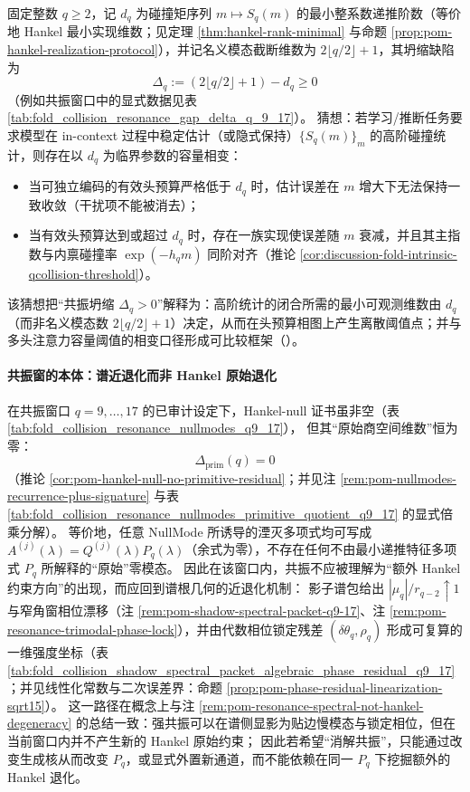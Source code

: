 \begin{conjecture}\label{conj:discussion-hankel-collapse-head-budget-phase-transition}
固定整数 \(q\ge 2\)，记 \(d_q\) 为碰撞矩序列 \(m\mapsto S_q(m)\) 的最小整系数递推阶数（等价地 Hankel 最小实现维数；见定理 \ref{thm:hankel-rank-minimal} 与命题 \ref{prop:pom-hankel-realization-protocol}），并记名义模态截断维数为 \(2\lfloor q/2\rfloor+1\)，其坍缩缺陷为
\[
\Delta_q:=(2\lfloor q/2\rfloor+1)-d_q\ge 0
\]
（例如共振窗口中的显式数据见表 \ref{tab:fold_collision_resonance_gap_delta_q_9_17}）。
猜想：若学习/推断任务要求模型在 in-context 过程中稳定估计（或隐式保持）\(\{S_q(m)\}_{m}\) 的高阶碰撞统计，则存在以 \(d_q\) 为临界参数的容量相变：
\begin{itemize}
  \item 当可独立编码的有效头预算严格低于 \(d_q\) 时，估计误差在 \(m\) 增大下无法保持一致收敛（干扰项不能被消去）；
  \item 当有效头预算达到或超过 \(d_q\) 时，存在一族实现使误差随 \(m\) 衰减，并且其主指数与内禀碰撞率 \(\exp(-h_q m)\) 同阶对齐（推论 \ref{cor:discussion-fold-intrinsic-qcollision-threshold}）。
\end{itemize}
该猜想把“共振坍缩 \(\Delta_q>0\)”解释为：高阶统计的闭合所需的最小可观测维数由 \(d_q\)（而非名义模态数 \(2\lfloor q/2\rfloor+1\)）决定，从而在头预算相图上产生离散阈值点；并与多头注意力容量阈值的相变口径形成可比较框架（\cite{Adler2026CapacityRationaleMultiHeadAttention}）。
\end{conjecture}

\paragraph{共振窗的本体：谱近退化而非 Hankel 原始退化}
在共振窗口 \(q=9,\dots,17\) 的已审计设定下，Hankel-null 证书虽非空（表 \ref{tab:fold_collision_resonance_nullmodes_q9_17}），
但其“原始商空间维数”恒为零：
\[
\Delta_{\mathrm{prim}}(q)=0
\]
（推论 \ref{cor:pom-hankel-null-no-primitive-residual}；并见注 \ref{rem:pom-nullmodes-recurrence-plus-signature} 与表 \ref{tab:fold_collision_resonance_nullmodes_primitive_quotient_q9_17} 的显式倍乘分解）。
等价地，任意 NullMode 所诱导的湮灭多项式均可写成 \(A^{(j)}(\lambda)=Q^{(j)}(\lambda)P_q(\lambda)\)（余式为零），不存在任何不由最小递推特征多项式 \(P_q\) 所解释的“原始”零模态。
因此在该窗口内，共振不应被理解为“额外 Hankel 约束方向”的出现，而应回到谱根几何的近退化机制：
影子谱包给出 \(|\mu_q|/r_{q-2}\uparrow 1\) 与窄角窗相位漂移（注 \ref{rem:pom-shadow-spectral-packet-q9-17}、注 \ref{rem:pom-resonance-trimodal-phase-lock}），并由代数相位锁定残差 \((\delta\theta_q,\rho_q)\) 形成可复算的一维强度坐标（表 \ref{tab:fold_collision_shadow_spectral_packet_algebraic_phase_residual_q9_17}；并见线性化常数与二次误差界：命题 \ref{prop:pom-phase-residual-linearization-sqrt15}）。
这一路径在概念上与注 \ref{rem:pom-resonance-spectral-not-hankel-degeneracy} 的总结一致：强共振可以在谱侧显影为贴边慢模态与锁定相位，但在当前窗口内并不产生新的 Hankel 原始约束；
因此若希望“消解共振”，只能通过改变生成核从而改变 \(P_q\)，或显式外置新通道，而不能依赖在同一 \(P_q\) 下挖掘额外的 Hankel 退化。

